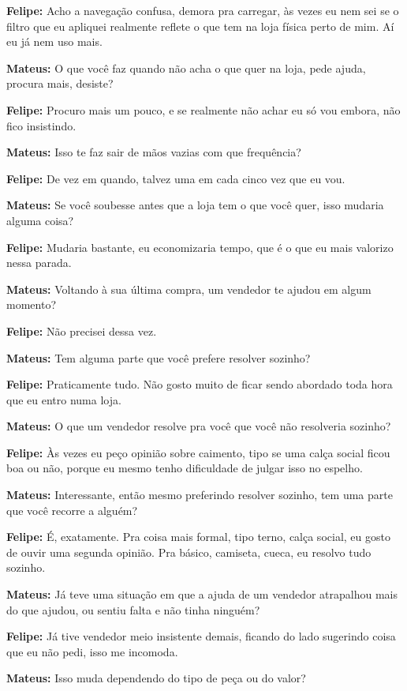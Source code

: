 \textbf{Felipe:} Acho a navegação confusa, demora pra carregar, às vezes eu nem sei se o filtro que eu apliquei realmente reflete o que tem na loja física perto de mim. Aí eu já nem uso mais.

\textbf{Mateus:} O que você faz quando não acha o que quer na loja, pede ajuda, procura mais, desiste?

\textbf{Felipe:} Procuro mais um pouco, e se realmente não achar eu só vou embora, não fico insistindo.

\textbf{Mateus:} Isso te faz sair de mãos vazias com que frequência?

\textbf{Felipe:} De vez em quando, talvez uma em cada cinco vez que eu vou.

\textbf{Mateus:} Se você soubesse antes que a loja tem o que você quer, isso mudaria alguma coisa?

\textbf{Felipe:} Mudaria bastante, eu economizaria tempo, que é o que eu mais valorizo nessa parada.

\textbf{Mateus:} Voltando à sua última compra, um vendedor te ajudou em algum momento?

\textbf{Felipe:} Não precisei dessa vez.

\textbf{Mateus:} Tem alguma parte que você prefere resolver sozinho?

\textbf{Felipe:} Praticamente tudo. Não gosto muito de ficar sendo abordado toda hora que eu entro numa loja.

\textbf{Mateus:} O que um vendedor resolve pra você que você não resolveria sozinho?

\textbf{Felipe:} Às vezes eu peço opinião sobre caimento, tipo se uma calça social ficou boa ou não, porque eu mesmo tenho dificuldade de julgar isso no espelho.

\textbf{Mateus:} Interessante, então mesmo preferindo resolver sozinho, tem uma parte que você recorre a alguém?

\textbf{Felipe:} É, exatamente. Pra coisa mais formal, tipo terno, calça social, eu gosto de ouvir uma segunda opinião. Pra básico, camiseta, cueca, eu resolvo tudo sozinho.

\textbf{Mateus:} Já teve uma situação em que a ajuda de um vendedor atrapalhou mais do que ajudou, ou sentiu falta e não tinha ninguém?

\textbf{Felipe:} Já tive vendedor meio insistente demais, ficando do lado sugerindo coisa que eu não pedi, isso me incomoda.

\textbf{Mateus:} Isso muda dependendo do tipo de peça ou do valor?

